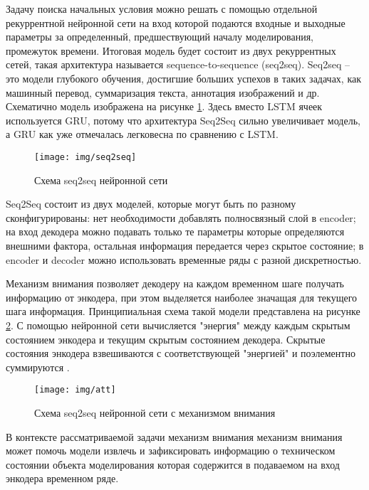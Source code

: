 \documentclass[12pt,a4paper]{article}
\begin{document}
Задачу поиска начальных условия можно решать с помощью отдельной рекуррентной нейронной сети на вход которой подаются входные и выходные параметры за определенный, предшествующий началу моделирования, промежуток времени. Итоговая модель будет состоит из двух рекуррентных сетей, такая архитектура называется sequence-to-sequence (seq2seq). Seq2seq – это модели глубокого обучения, достигшие больших успехов в таких задачах, как машинный перевод, суммаризация текста, аннотация изображений и др. Схематично модель изображена на рисунке \ref{fig:seq2seq}. Здесь вместо LSTM ячеек используется GRU, потому что архитектура Seq2Seq сильно увеличивает модель, а GRU как уже отмечалась легковесна по сравнению с LSTM.

\begin{figure}[htb]
	\centering\texttt{[image: img/seq2seq]}
	\caption{Схема seq2seq нейронной сети}
	\label{fig:seq2seq}
\end{figure}

Seq2Seq состоит из двух моделей, которые могут быть по разному сконфигурированы: нет необходимости добавлять полносвязный слой в encoder; на вход декодера можно подавать только те параметры которые определяются внешними фактора, остальная информация передается через скрытое состояние; в encoder и decoder можно использовать временные ряды с разной дискретностью.


Механизм внимания позволяет декодеру на каждом временном шаге получать информацию от энкодера, при этом выделяется наиболее значащая для текущего шага информация. Принципиальная схема такой модели представлена на рисунке \ref{fig:att}. С помощью нейронной сети вычисляется "энергия" между каждым скрытым состоянием энкодера и текущим скрытым состоянием декодера. Скрытые состояния энкодера  взвешиваются с соответствующей "энергией" и поэлементно суммируются \cite{medium_brenner}.

\begin{figure}[htb]
	\centering\texttt{[image: img/att]}
	\caption{Схема seq2seq нейронной сети с механизмом внимания}
	\label{fig:att}
\end{figure}

В контексте рассматриваемой задачи механизм внимания механизм внимания может помочь модели извлечь и зафиксировать информацию о техническом состоянии объекта моделирования которая содержится в подаваемом на вход энкодера временном ряде.



\end{document}
